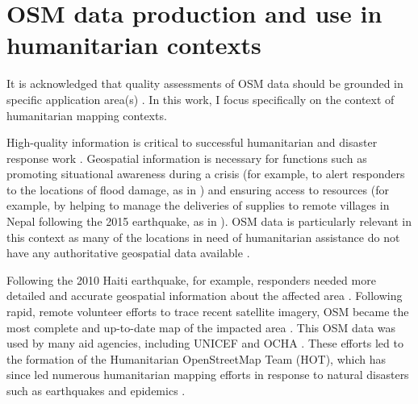 \section{OSM data production and use in humanitarian contexts}

It is acknowledged that quality assessments of OSM data should be grounded in specific application area(s) \parencite{barron_comprehensive_2014}. In this work, I focus specifically on the context of humanitarian mapping contexts.

High-quality information is critical to successful humanitarian and disaster response work \parencite{cowan_geospatial_2011, poser_volunteered_2010, soden_infrastructure_2016, zook_volunteered_2010}. Geospatial information is necessary for functions such as promoting situational awareness during a crisis (for example, to alert responders to the locations of flood damage, as in \textcite{poser_volunteered_2010}) and ensuring access to resources (for example, by helping to manage the deliveries of supplies to remote villages in Nepal following the 2015 earthquake, as in \textcite{soden_infrastructure_2016}). OSM data is particularly relevant in this context as many of the locations in need of humanitarian assistance do not have any authoritative geospatial data available \parencite{zook_volunteered_2010}. 

Following the 2010 Haiti earthquake, for example, responders needed more detailed and accurate geospatial information about the affected area  \parencite{meier_crisis_2012, soden_infrastructure_2016, zook_volunteered_2010}. Following rapid, remote volunteer efforts to trace recent satellite imagery, OSM became the most complete and up-to-date map of the impacted area \parencite{soden_crowdsourced_2014}. This OSM data was used by many aid agencies, including UNICEF and OCHA \parencite{soden_crowdsourced_2014}. These efforts led to the formation of the Humanitarian OpenStreetMap Team (HOT), which has since led numerous humanitarian mapping efforts in response to natural disasters such as earthquakes and epidemics \parencite{dittus_mass_2017}. 

